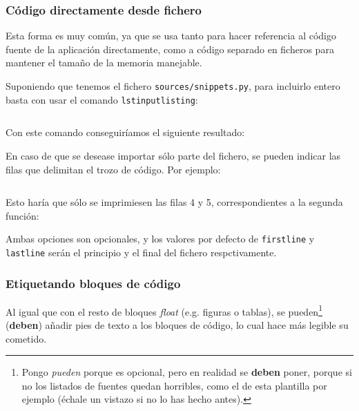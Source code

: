 

\subsubsection{Código directamente desde fichero}

Esta forma es muy común, ya que se usa tanto para hacer referencia al código fuente de la aplicación directamente, como a código separado en ficheros para mantener el tamaño de la memoria manejable.

Suponiendo que tenemos el fichero \texttt{sources/snippets.py}, para incluirlo entero basta con usar el comando \texttt{lstinputlisting}:

\begin{lstlisting}[language=TeX]

\end{lstlisting}

Con este comando conseguiríamos el siguiente resultado:



En caso de que se desease importar sólo parte del fichero, se pueden indicar las filas que delimitan el trozo de código. Por ejemplo:

\begin{lstlisting}[language=TeX]

\end{lstlisting}

Esto haría que sólo se imprimiesen las filas 4 y 5, correspondientes a la segunda función:



Ambas opciones son opcionales, y los valores por defecto de \texttt{firstline} y \texttt{lastline} serán el principio y el final del fichero respctivamente.

\subsubsection{Etiquetando bloques de código}

Al igual que con el resto de bloques \textit{float} (e.g. figuras o tablas), se pueden\footnote{Pongo \textit{pueden} porque es opcional, pero en realidad se \textbf{deben} poner, porque si no los listados de fuentes quedan horribles, como el de esta plantilla por ejemplo (échale un vistazo si no lo has hecho antes).} (\textbf{deben}) añadir pies de texto a los bloques de código, lo cual hace más legible su cometido.

